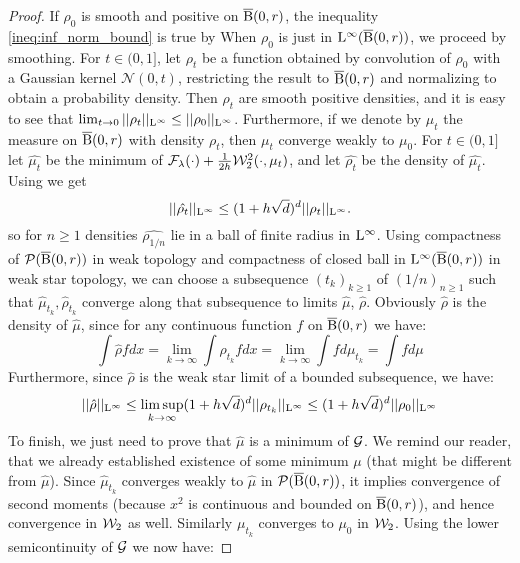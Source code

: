 \begin{proof}
If $\rho_0$ is smooth and positive on $\operatorname{\overline{B}}(0,r)$, the inequality \ref{ineq:inf_norm_bound} is true by \cite[Lemma 5.4.3.]{bonnotte2013unidimensional} When $\rho_0$ is just in $\mathrm{L}^{\infty}(\operatorname{\overline{B}}(0,r))$, we proceed by smoothing. 
For $t \in (0,1]$, let $\rho_t$ be a function obtained by convolution of $\rho_0$ with a Gaussian kernel $\mathcal{N}(0, t)$, restricting the result to $\operatorname{\overline{B}}(0,r)$ and normalizing to obtain a probability density. Then $\rho_t$ are smooth positive densities, and it is easy to see that $\lim_{t \rightarrow 0} ||\rho_t||_{\mathrm{L}^{\infty}} \leq ||\rho_0||_{\mathrm{L}^{\infty}}$. Furthermore, if we denote by $\mu_t$ the measure on $\operatorname{\overline{B}}(0,r)$ with density $\rho_t$, then $\mu_t$ converge weakly to $\mu_0$.
For $t \in (0, 1]$ let $\hat{\mu_t}$ be the minimum of $ \mathcal{F}_{\lambda}(\cdot) + \frac{1}{2h} {\cal W}_2^2(\cdot, \mu_t)$, and let $\hat{\rho_t}$ be the density of $\hat{\mu_t}$. Using \cite[Lemma 5.4.3.]{bonnotte2013unidimensional} we get 
\[
||\hat{\rho_t} ||_{\mathrm{L}^{\infty}} \leq (1 + h\sqrt{d})^d ||\rho_t||_{\mathrm{L}^{\infty}}.
\]
so for $n \geq 1$ densities $\hat{\rho_{1/n}}$ lie in a ball of finite radius in $\mathrm{L}^{\infty}$.  Using compactness of $\mathcal{P}(\operatorname{\overline{B}}(0,r))$ in weak topology and compactness of closed ball in $\mathrm{L}^{\infty}(\operatorname{\overline{B}}(0,r))$ in weak star topology, we can choose a subsequence $(t_k)_{k \geq 1}$  of $(1/n)_{n \geq 1}$ such that $\hat{\mu}_{t_k} , \hat{\rho}_{t_k}$ converge along that subsequence to limits $\hat{\mu}$, $\hat{\rho}$. Obviously $\hat{\rho}$ is the density of $\hat{\mu}$, since for any continuous function $f$  on $\operatorname{\overline{B}}(0,r)$ we have:
\[
\int \hat{\rho} f dx = \lim_{k \rightarrow \infty} \int \rho_{t_k} f dx = \lim_{k \rightarrow \infty} \int f d\mu_{t_k} = \int f d\mu
\]
Furthermore, since $\hat{\rho}$ is the weak star limit of a bounded subsequence, we have:
\[
||\hat{\rho} ||_{\mathrm{L}^{\infty}} \leq \limsup_{k \rightarrow \infty}(1 + h\sqrt{d})^d ||\rho_{t_k}||_{\mathrm{L}^{\infty}} \leq (1 + h\sqrt{d})^d ||\rho_0||_{\mathrm{L}^{\infty}}
\]
To finish, we just need to prove that $\hat{\mu}$ is a minimum of $\mathcal{G}$. We remind our reader, that we already established existence of some minimum $\mu$ (that might be different from $\hat{\mu}$). Since $\hat{\mu}_{t_k}$ converges weakly to $\hat{\mu}$ in $\mathcal{P}(\operatorname{\overline{B}}(0,r))$, it implies convergence of second moments (because $x^2$ is continuous and bounded on $\operatorname{\overline{B}}(0,r)$), and hence convergence in ${\cal W}_2$ as well. Similarly $\mu_{t_k}$ converges to $\mu_0$ in ${\cal W}_2$. Using the lower semicontinuity of $\mathcal{G}$ we now have:

\end{proof}
